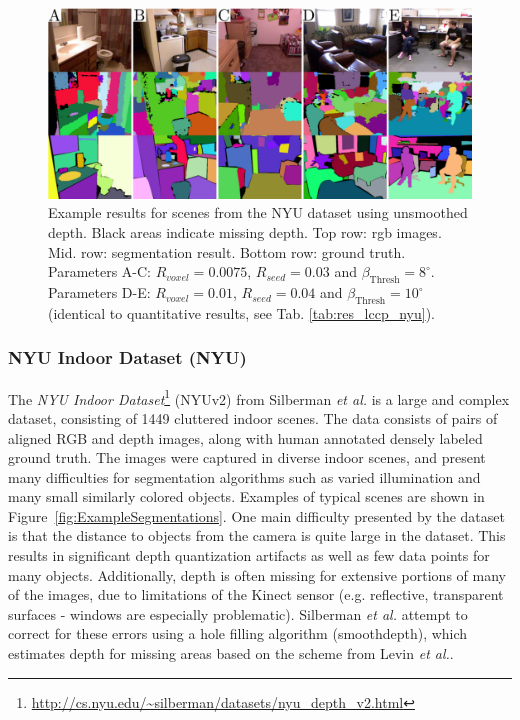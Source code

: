 \begin{figure}[!thb]
 \centering
 \includegraphics[width=1\linewidth]{figures/CVPR2014/nyu_examples.pdf}
 \caption[NYU Dataset Examples]{Example results for scenes from the NYU dataset using unsmoothed depth. Black areas indicate missing depth. Top row: rgb images. Mid. row: segmentation result. Bottom row: ground truth. Parameters A-C: $R_{voxel}=0.0075$, $R_{seed}=0.03$ and $\beta_\text{Thresh}=8^\circ$. Parameters D-E: $R_{voxel}=0.01$, $R_{seed}=0.04$ and $\beta_\text{Thresh}=10^\circ$ (identical to quantitative results, see Tab. \ref{tab:res_lccp_nyu}).}
 \label{fig:nyu_examples}
\end{figure}

\subsubsection{NYU Indoor Dataset (NYU)}
The \textit{NYU Indoor Dataset}\footnote{\url{http://cs.nyu.edu/~silberman/datasets/nyu_depth_v2.html}} (NYUv2) from Silberman \textit{et al.}\cite{Silberman:ECCV12} is a large and complex dataset, consisting of 1449 cluttered indoor scenes. The data consists of pairs of aligned RGB and depth images, along with human annotated densely labeled ground truth. The images were captured in diverse indoor scenes, and present many difficulties for segmentation algorithms such as varied illumination and many small similarly colored objects. Examples of typical scenes are shown in Figure~\ref{fig:ExampleSegmentations}. One main difficulty presented by the dataset is that the distance to objects from the camera is quite large in the dataset. This results in significant depth quantization artifacts as well as few data points for many objects. Additionally, depth is often missing for extensive portions of many of the images, due to limitations of the Kinect sensor (e.g. reflective, transparent surfaces - windows are especially problematic). Silberman \textit{et al.} attempt to correct for these errors using a hole filling algorithm (smoothdepth), which estimates depth for missing areas based on the scheme from Levin \textit{et al.}\cite{Levin2004}.


